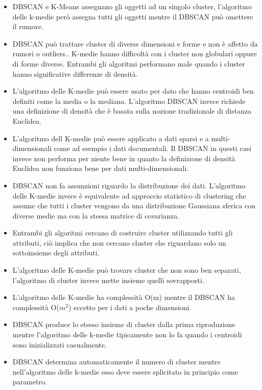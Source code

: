 \begin{itemize}
	\item DBSCAN e K-Means assegnano gli oggetti ad un singolo cluster, l'algoritmo delle k-medie però assegna tutti gli oggetti mentre il DBSCAN può omettere il rumore.
	\item DBSCAN può trattare cluster di diverse dimensioni e forme e non è affetto da rumori o outliers.. K-medie hanno difficoltà con i cluster non globulari oppure di forme diverse. Entrambi gli algoritmi performano male quando i cluster hanno significative differenze di densità.
	\item L'algoritmo delle K-medie può essere usato per dato che hanno centroidi ben definiti come la media o la mediana. L'algoritmo DBSCAN invece richiede una definizione di densità che è basata sulla nozione tradizionale di distanza Euclidea.
	\item L'algoritmo dell K-medie può essere applicato a dati sparsi e a multi-dimensionali come ad esempio i dati documentali. Il DBSCAN in questi casi invece non performa per niente bene in quanto la definizione di densità Euclidea non funziona bene per dati multi-dimensionali.
	\item DBSCAN non fa assunzioni riguardo la distribuzione dei dati. L'algoritmo delle K-medie invece è equivalente ad approccio statistico di clustering che assume che tutti i cluster vengono da una distribuzione Gaussiana sferica con diverse medie ma con la stessa matrice di covarianza.
	\item Entrambi gli algoritmi cercano di costruire cluster utilizzando tutti gli attributi, ciò implica che non cercano cluster che riguardano solo un sottoinsieme degli attributi.
	\item L'algoritmo delle K-medie può trovare cluster che non sono ben separati, l'algoritmo di cluster invece mette insieme quelli sovrapposti.
	
	\item L'algoritmo delle K-medie ha complessità O(m) mentre il DBSCAN ha complessità O($m^{2}$) eccetto per i dati a poche dimensioni.
	\item DBSCAN produce lo stesso insieme di cluster dalla prima riproduzione mentre l'algoritmo delle k-medie tipicamente non lo fa quando i centroidi sono inizializzati casualmente. 
	\item DBSCAN determina automaticamente il numero di cluster mentre nell'algoritmo delle k-medie esso deve essere splicitato in principio come parametro.
\end{itemize}

